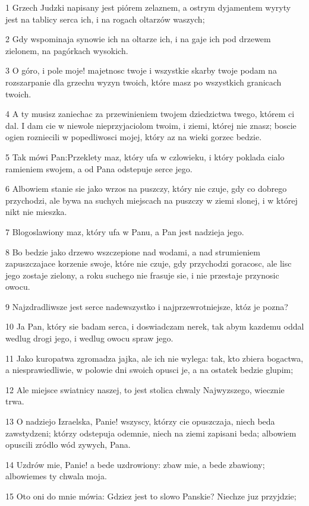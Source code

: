 \par 1 Grzech Judzki napisany jest piórem zelaznem, a ostrym dyjamentem wyryty jest na tablicy serca ich, i na rogach oltarzów waszych;
\par 2 Gdy wspominaja synowie ich na oltarze ich, i na gaje ich pod drzewem zielonem, na pagórkach wysokich.
\par 3 O góro, i pole moje! majetnosc twoje i wszystkie skarby twoje podam na rozszarpanie dla grzechu wyzyn twoich, które masz po wszystkich granicach twoich.
\par 4 A ty musisz zaniechac za przewinieniem twojem dziedzictwa twego, którem ci dal. I dam cie w niewole nieprzyjaciolom twoim, i ziemi, której nie znasz; boscie ogien rozniecili w popedliwosci mojej, który az na wieki gorzec bedzie.
\par 5 Tak mówi Pan:Przeklety maz, który ufa w czlowieku, i który poklada cialo ramieniem swojem, a od Pana odstepuje serce jego.
\par 6 Albowiem stanie sie jako wrzos na puszczy, który nie czuje, gdy co dobrego przychodzi, ale bywa na suchych miejscach na puszczy w ziemi slonej, i w której nikt nie mieszka.
\par 7 Blogoslawiony maz, który ufa w Panu, a Pan jest nadzieja jego.
\par 8 Bo bedzie jako drzewo wszczepione nad wodami, a nad strumieniem zapuszczajace korzenie swoje, które nie czuje, gdy przychodzi goracosc, ale lisc jego zostaje zielony, a roku suchego nie frasuje sie, i nie przestaje przynosic owocu.
\par 9 Najzdradliwsze jest serce nadewszystko i najprzewrotniejsze, któz je pozna?
\par 10 Ja Pan, który sie badam serca, i doswiadczam nerek, tak abym kazdemu oddal wedlug drogi jego, i wedlug owocu spraw jego.
\par 11 Jako kuropatwa zgromadza jajka, ale ich nie wylega: tak, kto zbiera bogactwa, a niesprawiedliwie, w polowie dni swoich opusci je, a na ostatek bedzie glupim;
\par 12 Ale miejsce swiatnicy naszej, to jest stolica chwaly Najwyzszego, wiecznie trwa.
\par 13 O nadziejo Izraelska, Panie! wszyscy, którzy cie opuszczaja, niech beda zawstydzeni; którzy odstepuja odemnie, niech na ziemi zapisani beda; albowiem opuscili zródlo wód zywych, Pana.
\par 14 Uzdrów mie, Panie! a bede uzdrowiony: zbaw mie, a bede zbawiony; albowiemes ty chwala moja.
\par 15 Oto oni do mnie mówia: Gdziez jest to slowo Panskie? Niechze juz przyjdzie;
